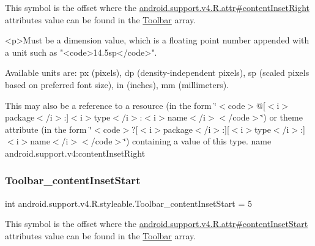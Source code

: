 This symbol is the offset where the \hyperlink{classandroid_1_1support_1_1v4_1_1R_1_1attr_aae1b287277312b537031bed0d24863b0}{android.\+support.\+v4.\+R.\+attr\#content\+Inset\+Right} attribute\textquotesingle{}s value can be found in the \hyperlink{classandroid_1_1support_1_1v4_1_1R_1_1styleable_a211358a2f951023c7735caea0fb5ae04}{Toolbar} array.

\begin{DoxyVerb}      <p>Must be a dimension value, which is a floating point number appended with a unit such as "<code>14.5sp</code>".
\end{DoxyVerb}
 Available units are\+: px (pixels), dp (density-\/independent pixels), sp (scaled pixels based on preferred font size), in (inches), mm (millimeters). 

This may also be a reference to a resource (in the form \char`\"{}$<$code$>$@\mbox{[}$<$i$>$package$<$/i$>$\+:\mbox{]}$<$i$>$type$<$/i$>$\+:$<$i$>$name$<$/i$>$$<$/code$>$\char`\"{}) or theme attribute (in the form \char`\"{}$<$code$>$?\mbox{[}$<$i$>$package$<$/i$>$\+:\mbox{]}\mbox{[}$<$i$>$type$<$/i$>$\+:\mbox{]}$<$i$>$name$<$/i$>$$<$/code$>$\char`\"{}) containing a value of this type.  name android.\+support.\+v4\+:content\+Inset\+Right \mbox{\label{classandroid_1_1support_1_1v4_1_1R_1_1styleable_ae49023876e1eb052f0650805f60750f1}} 
\subsubsection{\texorpdfstring{Toolbar\+\_\+content\+Inset\+Start}{Toolbar\_contentInsetStart}}
{\footnotesize\ttfamily int android.\+support.\+v4.\+R.\+styleable.\+Toolbar\+\_\+content\+Inset\+Start = 5\hspace{0.3cm}{\ttfamily [static]}}

This symbol is the offset where the \hyperlink{classandroid_1_1support_1_1v4_1_1R_1_1attr_a271705b242fb5e101f893f6821b0149f}{android.\+support.\+v4.\+R.\+attr\#content\+Inset\+Start} attribute\textquotesingle{}s value can be found in the \hyperlink{classandroid_1_1support_1_1v4_1_1R_1_1styleable_a211358a2f951023c7735caea0fb5ae04}{Toolbar} array.


